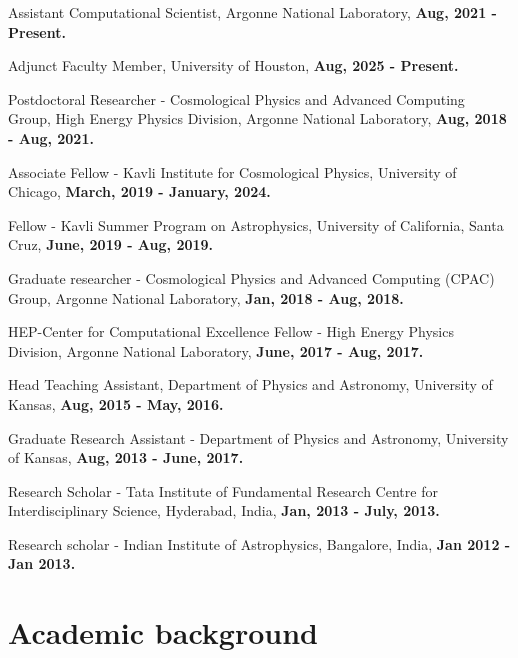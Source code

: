 \documentclass[letterpaper]{article}
\renewenvironment{itemize}{
  \begin{list}{}{
    \setlength{\leftmargin}{1.5em}
  }
}{
  \end{list}
}
\begin{document}
\begin{itemize}
\item Assistant Computational Scientist, Argonne National Laboratory, \textbf{Aug, 2021 - Present.}
\item Adjunct Faculty Member, University of Houston, \textbf{Aug, 2025 - Present.}
\item Postdoctoral Researcher -  Cosmological Physics and Advanced Computing Group, High Energy Physics Division, Argonne National Laboratory, \textbf{Aug, 2018 - Aug, 2021.}
\item Associate Fellow - Kavli Institute for Cosmological Physics, University of Chicago, \textbf{March, 2019 - January, 2024.}
\item Fellow - Kavli Summer Program on Astrophysics, University of California, Santa Cruz, \textbf{June, 2019 - Aug, 2019.}
\item Graduate researcher - Cosmological Physics and Advanced Computing (CPAC) Group, Argonne National Laboratory, \textbf{Jan, 2018 - Aug, 2018.}
\item HEP-Center for Computational Excellence Fellow - High Energy Physics Division, Argonne National Laboratory, \textbf{June, 2017 - Aug, 2017.}
\item Head Teaching Assistant, Department of Physics and Astronomy, University of Kansas, \textbf{Aug, 2015 - May, 2016.}
\item Graduate Research Assistant -  Department of Physics and Astronomy, University of Kansas, \textbf{Aug, 2013 - June, 2017.}
\item Research Scholar - Tata Institute of Fundamental Research Centre for Interdisciplinary Science, Hyderabad, India, \textbf{Jan, 2013 - July, 2013.}
\item Research scholar - Indian Institute of Astrophysics, Bangalore, India, \textbf{Jan 2012 - Jan 2013.}
\end{itemize}

\section*{Academic background}
\end{document}
